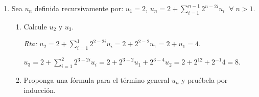 \documentclass[a4paper,12pt,twoside,spanish,reqno]{amsbook}
\numberwithin{equation}{section}
\newcommand{\rta}{\noindent\textit{Rta: }}
\begin{document}
\begin{enumerate}
        {\it (Paso  inductivo) } Supongamos que $k \ge 2$ y el resultado  es cierto para los $h$ tales que  $1 \le h \le k$. Es decir que $u_h = 2^{h+1} + 5^h$ para $1 \le h \le k$ y $k \ge 2$ (hipótesis inductiva), entonces debemos probar que $u_{k+1} = 2^{k+2}+5^{k+1}$. Ahora bien, 
        \begin{equation*}
        \begin{matrix}
        u_{k+1} &=& 7u_{k+1-1} - 10u_{k+1-2}  \hfill &\quad \text{(por definición recursiva)} \hfill \\
        &=& 7u_{k} - 10u_{k-1}  \hfill &\hfill\\
        &=& 7( 2^{k+1} + 5^k) -10 ( 2^{k-1+1} + 5^{k-1})  \hfill &\quad \text{(por hipótesis inductiva})\hfill \\
        &=& 7 \cdot  2^{k+1} + 7 \cdot 5^k -10 \cdot  2^{k} -10 \cdot  5^{k-1} \hfill  & \hfill\\
        &=& 7 \cdot 2 \cdot  2^{k} + 7 \cdot 5 \cdot 5^{k-1} -10 \cdot  2^{k} -10 \cdot  5^{k-1}  \hfill  & \hfill\\
        &=& (7 \cdot 2 -10 ) \cdot  2^{k} + (7 \cdot 5 -10) \cdot 5^{k-1}  \hfill  & \hfill\\
        &=& 4 \cdot  2^{k} + 25 \cdot 5^{k-1}  \hfill  & \hfill\\
        &=& 2^2 \cdot  2^{k} + 5^2 \cdot 5^{k-1}  \hfill  & \hfill\\
        &=& 2^{k+2} + 5^{k+1}  \hfill  & \hfill
        \end{matrix}
        \end{equation*}
        
        
                
        
        
        \item Sea $u_n$ definida recursivamente por: $u_1=2$, $u_n=2+\sum_{i=1}^{n-1}2^{n-2i}u_i \;\;\forall\; n >1$.
        \begin{enumerate}
            \item Calcule $u_2$ y $u_3$.
            
            \rta $u_2 = 2+\sum_{i=1}^{1}2^{2-2i}u_i = 2+2^{2-2}u_1 = 2 + u_1 = 4$.
            
            $u_3 = 2+\sum_{i=1}^{2}2^{3-2i}u_i = 2+2^{3-2}u_1 + 2^{3-4}u_2=2+2^12 + 2^{-1}4 = 8$.
            
            \item Proponga una fórmula para el término general $u_n$ y pruébela por inducción.
            

\end{enumerate}
\end{enumerate}
\end{document}
